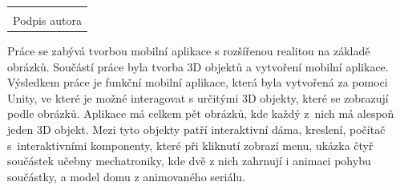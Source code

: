 \documentclass[12pt, a4paper,
twoside,        %
openright
]{report}
\newcommand\datumOdevzdani{1. 1. 2024} %
\begin{document}
\cleardoublepage %
	

	

	
	\vspace*{0.7\textheight} %

	\vfill
	\noindent{V Opavě \datumOdevzdani\\}
	\noindent
	\begin{minipage}{\linewidth}
		\hspace{9.5cm} 
		\begin{tabular}{@{}p{6cm}@{}}
			\dotfill \\
			Podpis autora
		\end{tabular}
	\end{minipage}
	
	\cleardoublepage %


Práce se zabývá tvorbou mobilní aplikace s rozšířenou realitou na základě obrázků. Součástí práce byla tvorba 3D objektů a vytvoření mobilní aplikace. Výsledkem práce je funkční mobilní aplikace, která byla vytvořená za pomoci Unity, ve které je možné interagovat s určitými 3D objekty, které se zobrazují podle obrázků. Aplikace má celkem pět obrázků, kde každý z~nich má alespoň jeden 3D objekt. Mezi tyto objekty patří interaktivní dáma, kreslení, počítač s~interaktivními komponenty, které při kliknutí zobrazí menu, ukázka čtyř součástek učebny mechatroniky, kde dvě z nich zahrnují i animaci pohybu součástky, a model domu z animovaného seriálu.  
\end{document}
